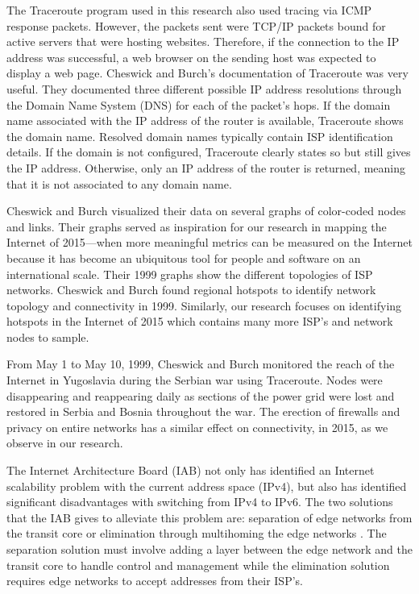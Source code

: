 \documentclass{sigcomm-alternate}
\begin{document}
The Traceroute program used in this research also used tracing via ICMP response packets. However, the packets sent were TCP/IP packets bound for active servers that were hosting websites. Therefore, if the connection to the IP address was successful, a web browser on the sending host was expected to display a web page. Cheswick and Burch’s documentation of Traceroute was very useful. They documented three different possible IP address resolutions through the Domain Name System (DNS) for each of the packet's hops. If the domain name associated with the IP address of the router is available, Traceroute shows the domain name. Resolved domain names typically contain ISP identification details. If the domain is not configured, Traceroute clearly states so but still gives the IP address. Otherwise, only an IP address of the router is returned, meaning that it is not associated to any domain name.

Cheswick and Burch visualized their data on several graphs of color-coded nodes and links. Their graphs served as inspiration for our research in mapping the Internet of 2015—when more meaningful metrics can be measured on the Internet because it has become an ubiquitous tool for people and software on an international scale. Their 1999 graphs show the different topologies of ISP networks. Cheswick and Burch found regional hotspots to identify network topology and connectivity in 1999. Similarly, our research focuses on identifying hotspots in the Internet of 2015 which contains many more ISP's and network nodes to sample.

From May 1 to May 10, 1999, Cheswick and Burch monitored the reach of the Internet in Yugoslavia during the Serbian war using Traceroute. Nodes were disappearing and reappearing daily as sections of the power grid were lost and restored in Serbia and Bosnia throughout the war. The erection of firewalls and privacy on entire networks has a similar effect on connectivity, in 2015, as we observe in our research.

The Internet Architecture Board (IAB) not only has identified an Internet scalability problem with the current address space (IPv4), but also has identified significant disadvantages with switching from IPv4 to IPv6. The two solutions that the IAB gives to alleviate this problem are: separation of edge networks from the transit core or elimination through multihoming the edge networks \cite{scalability}. The separation solution must involve adding a layer between the edge network and the transit core to handle control and management while the elimination solution requires edge networks to accept addresses from their ISP's.
\end{document}
